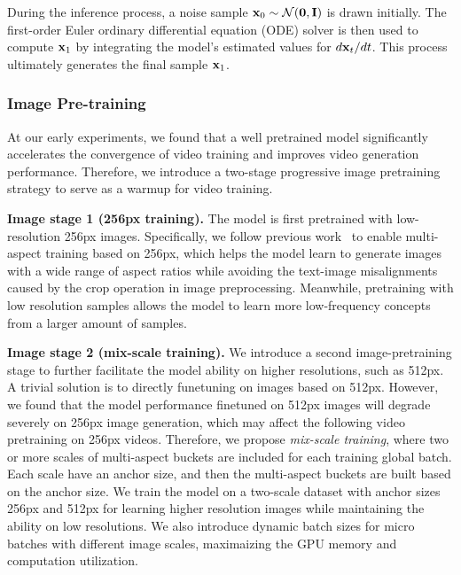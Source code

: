 During the inference process, a noise sample ${\rm \bf{x}}_0 \sim \mathcal{N}({\rm \bf{0}}, {\rm \bf{I}})$ is drawn initially. The first-order Euler ordinary differential equation (ODE) solver is then used to compute ${\rm \bf{x}}_1$ by integrating the model's estimated values for $d{\rm \bf{x}}_t/dt$. This process ultimately generates the final sample ${\rm \bf{x}}_1$.

\subsubsection{Image Pre-training}

At our early experiments, we found that a well pretrained model significantly accelerates the convergence of video training and improves video generation performance. Therefore, we introduce a two-stage progressive image pretraining strategy to serve as a warmup for video training. 

\textbf{Image stage 1 (256px training).} The model is first pretrained with low-resolution 256px images. Specifically, we follow previous work~\cite{podell2023sdxl} to enable multi-aspect training based on 256px, which helps the model learn to generate images with a wide range of aspect ratios while avoiding the text-image misalignments caused by the crop operation in image preprocessing. Meanwhile, pretraining with low resolution samples allows the model to learn more low-frequency concepts from a larger amount of samples. 

\textbf{Image stage 2 (mix-scale training).} We introduce a second image-pretraining stage to further facilitate the model ability on higher resolutions, such as 512px. A trivial solution is to directly funetuning on images based on 512px. However, we found that the model performance finetuned on 512px images will degrade severely on 256px image generation, which may affect the following video pretraining on 256px videos. Therefore, we propose \textit{mix-scale training}, where two or more scales of multi-aspect buckets are included for each training global batch. Each scale have an anchor size, and then the multi-aspect buckets are built based on the anchor size. We train the model on a two-scale dataset with anchor sizes 256px and 512px for learning higher resolution images while maintaining the ability on low resolutions. We also introduce dynamic batch sizes for micro batches with different image scales, maximaizing the GPU memory and computation utilization.


